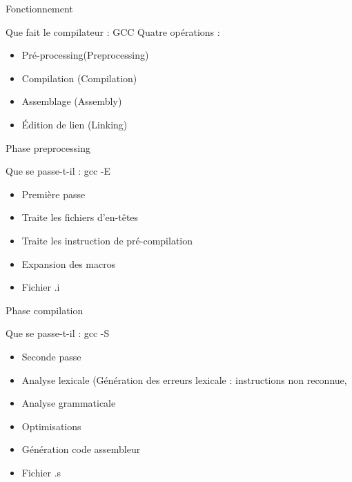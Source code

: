 \def\ftitle{Fonctionnement}
\begin{frame}[containsverbatim]{\ftitle}
\def\blocktitle{Que fait le compilateur : GCC}
\begin{block}{\blocktitle}
Quatre opérations :
\begin{itemize}
\item Pré-processing(Preprocessing)
\item Compilation (Compilation)
\item Assemblage (Assembly)
\item Édition de lien (Linking)
\end{itemize}
\end{block}
\end{frame}


\def\ftitle{Phase preprocessing}
\begin{frame}[containsverbatim]{\ftitle}
\def\blocktitle{Que se passe-t-il : gcc -E}
\begin{block}{\blocktitle}
\begin{itemize}
\item Première passe
\item Traite les fichiers d'en-têtes
\item Traite les instruction de pré-compilation
\item Expansion des macros
\item Fichier .i
\end{itemize}
\end{block}
\end{frame}

\def\ftitle{Phase compilation}
\begin{frame}[containsverbatim]{\ftitle}
\def\blocktitle{Que se passe-t-il : gcc -S}
\begin{block}{\blocktitle}
\begin{itemize}
\item Seconde passe
\item Analyse lexicale (Génération des erreurs lexicale : instructions non reconnue, 
\item Analyse grammaticale
\item Optimisations
\item Génération code assembleur
\item Fichier .s
\end{itemize}
\end{block}
\end{frame}


